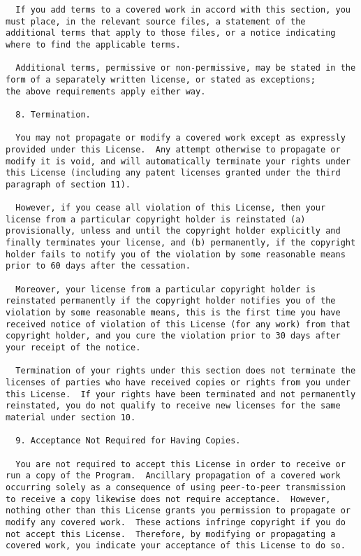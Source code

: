 \documentclass[11pt]{article}
\begin{document}
\begin{verbatim}
  If you add terms to a covered work in accord with this section, you
must place, in the relevant source files, a statement of the
additional terms that apply to those files, or a notice indicating
where to find the applicable terms.

  Additional terms, permissive or non-permissive, may be stated in the
form of a separately written license, or stated as exceptions;
the above requirements apply either way.

  8. Termination.

  You may not propagate or modify a covered work except as expressly
provided under this License.  Any attempt otherwise to propagate or
modify it is void, and will automatically terminate your rights under
this License (including any patent licenses granted under the third
paragraph of section 11).

  However, if you cease all violation of this License, then your
license from a particular copyright holder is reinstated (a)
provisionally, unless and until the copyright holder explicitly and
finally terminates your license, and (b) permanently, if the copyright
holder fails to notify you of the violation by some reasonable means
prior to 60 days after the cessation.

  Moreover, your license from a particular copyright holder is
reinstated permanently if the copyright holder notifies you of the
violation by some reasonable means, this is the first time you have
received notice of violation of this License (for any work) from that
copyright holder, and you cure the violation prior to 30 days after
your receipt of the notice.

  Termination of your rights under this section does not terminate the
licenses of parties who have received copies or rights from you under
this License.  If your rights have been terminated and not permanently
reinstated, you do not qualify to receive new licenses for the same
material under section 10.

  9. Acceptance Not Required for Having Copies.

  You are not required to accept this License in order to receive or
run a copy of the Program.  Ancillary propagation of a covered work
occurring solely as a consequence of using peer-to-peer transmission
to receive a copy likewise does not require acceptance.  However,
nothing other than this License grants you permission to propagate or
modify any covered work.  These actions infringe copyright if you do
not accept this License.  Therefore, by modifying or propagating a
covered work, you indicate your acceptance of this License to do so.


\end{verbatim}
\end{document}
